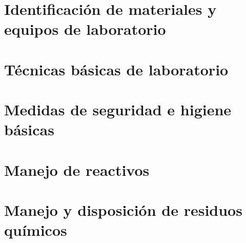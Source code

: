 

\section{Identificación de materiales y equipos de laboratorio}



\section{Técnicas básicas de laboratorio}



\section{Medidas de seguridad e higiene básicas}



\section{Manejo de reactivos}



\section{Manejo y disposición de residuos químicos}

